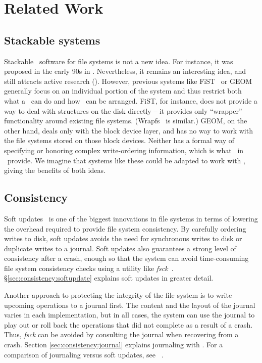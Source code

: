 \section{Related Work}
\label{sec:related}

\subsection{Stackable systems}


Stackable \module\ software for file systems is not a new idea. For instance, it
was proposed in the early 90s in \cite{rosenthal90evolving, heidemann91layered,
skinner93stacking, heidemann94filesystem}. Nevertheless, it remains an
interesting idea, and still attracts active research (\cite{zadok99extending,
zadok00fist}). However, previous systems like FiST~\cite{zadok00fist} or
GEOM~\cite{geom} generally focus on an individual portion of the system and
thus restrict both what a \module\ can do and how \modules\ can be arranged.
FiST, for instance, does not provide a way to deal with structures on the disk
directly -- it provides only ``wrapper'' functionality around existing file
systems. (Wrapfs~\cite{zadok99stackable, zadok99extending} is similar.) GEOM, on
the other hand, deals only with the block device layer, and has no way to work
with the file systems stored on those block devices. Neither has a formal way of
specifying or honoring complex write-ordering information, which is what
\chdescs\ in \Kudos\ provide. We imagine that systems like these could be
adapted to work with \chdescs, giving the benefits of both ideas.

\subsection{Consistency}

Soft updates~\cite{ganger00soft} is one of the biggest innovations in file
systems in terms of lowering the overhead required to provide file system
consistency. By carefully ordering writes to disk, soft updates avoids the need
for synchronous writes to disk or duplicate writes to a journal. Soft updates
also guarantees a strong level of consistency after a crash, enough so that the
system can avoid time-consuming file system consistency checks using a utility
like \emph{fsck}~\cite{mckusick94fsck}. \S\ref{sec:consistency:softupdate}
explains soft updates in greater detail.

Another approach to protecting the integrity of the file system is to write
upcoming operations to a journal first. The content and the layout of the
journal varies in each implementation, but in all cases, the system can use the
journal to play out or roll back the operations that did not complete as a
result of a crash. Thus, \emph{fsck} can be avoided by consulting the journal
when recovering from a crash. Section \ref{sec:consistency:journal} explains
journaling with \chdescs. For a comparison of journaling versus soft updates,
see ~\cite{seltzer00journaling}.

